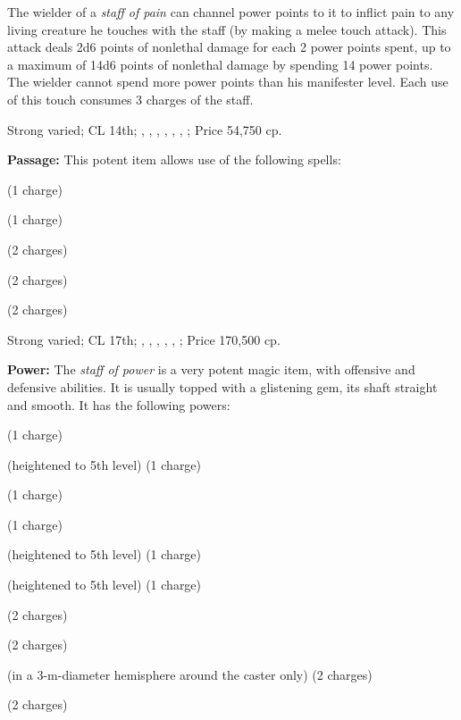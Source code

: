 The wielder of a \emph{staff of pain} can channel power points to it to inflict pain to any living creature he touches with the staff (by making a melee touch attack). This attack deals 2d6 points of nonlethal damage for each 2 power points spent, up to a maximum of 14d6 points of nonlethal damage by spending 14 power points. The wielder cannot spend more power points than his manifester level. Each use of this touch consumes 3 charges of the staff.

Strong varied; CL 14th; , , , , , , ; Price 54,750 cp.

\textbf{Passage:} This potent item allows use of the following spells:
\begin{itemize*}
\item {} (1 charge)
\item {} (1 charge)
\item {} (2 charges)
\item {} (2 charges)
\item {} (2 charges)
\end{itemize*}

Strong varied; CL 17th; , , , , , ; Price 170,500 cp.

\textbf{Power:} The \emph{staff of power} is a very potent magic item, with offensive and defensive abilities. It is usually topped with a glistening gem, its shaft straight and smooth. It has the following powers:
\begin{itemize*}
\item {} (1 charge)
\item {} (heightened to 5th level) (1 charge)
\item {} (1 charge)
\item {} (1 charge)
\item {} (heightened to 5th level) (1 charge)
\item {} (heightened to 5th level) (1 charge)
\item {} (2 charges)
\item {} (2 charges)
\item {} (in a 3-m-diameter hemisphere around the caster only) (2 charges)
\item {} (2 charges)
\end{itemize*}

